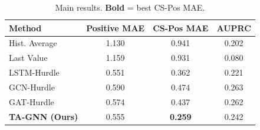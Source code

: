 \begin{table}[t]
\centering
\caption{Main results. \textbf{Bold} = best CS-Pos MAE.}
\small
\begin{tabular}{lccc}
\toprule
Method & Positive MAE & CS-Pos MAE & AUPRC \\
\midrule
Hist. Average & 1.130 & 0.941 & 0.202 \\
Last Value & 1.159 & 0.931 & 0.080 \\
LSTM-Hurdle & 0.551 & 0.362 & 0.221 \\
GCN-Hurdle & 0.590 & 0.474 & 0.263 \\
GAT-Hurdle & 0.574 & 0.437 & 0.262 \\
\textbf{TA-GNN (Ours)} & 0.555 & \textbf{0.259} & 0.242 \\
\bottomrule
\end{tabular}
\end{table}
